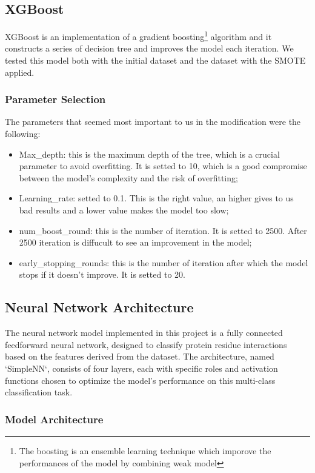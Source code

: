 \documentclass[10pt,twocolumn,letterpaper]{article}
\begin{document}
\subsection{XGBoost}
XGBoost\cite{DBLP:journals/corr/ChenG16} is an implementation of a gradient boosting\footnote{The boosting is an ensemble learning technique which 
imporove the performances of the model by combining weak model} algorithm and it constructs a series of decision
tree and improves the model each iteration. We tested this model both with the initial dataset and the dataset with the 
SMOTE applied.
\subsubsection{Parameter Selection}
The parameters that seemed most important to us in the modification were the following:
\begin{itemize}
    \item Max\_depth: this is the maximum depth of the tree, which is a crucial parameter to avoid overfitting. 
    It is setted to 10, which is a good compromise between the model's complexity and the risk of overfitting;
    \item Learning\_rate: setted to 0.1. This is the right value, an higher gives to us bad results and a lower 
    value makes the model too slow;
    \item num\_boost\_round: this is the number of iteration. It is setted to 2500. After 2500 iteration 
    is diffucult to see an improvement in the model;
    \item early\_stopping\_rounds: this is the number of iteration after which the model stops if it doesn't 
    improve. It is setted to 20.
\end{itemize}

\subsection{Neural Network Architecture}

The neural network model implemented in this project is a fully connected feedforward neural network, designed to classify protein residue interactions based on the features derived from the dataset. The architecture, named `SimpleNN`, consists of four layers, each with specific roles and activation functions chosen to optimize the model's performance on this multi-class classification task.

\subsubsection{Model Architecture}
\end{document}
